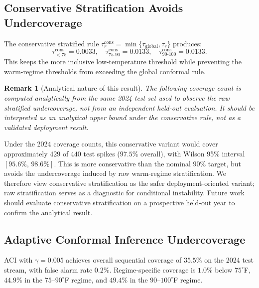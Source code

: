 \documentclass{article}
\newtheorem{remark}{Remark}
\begin{document}
\subsection{Conservative Stratification Avoids Undercoverage}

The conservative stratified rule $\tau_r^{\mathrm{cons}} = \min\{\tau_{\mathrm{global}},
\tau_r\}$ produces:
\[
    \tau_{<75}^{\mathrm{cons}}=0.0033,\quad
    \tau_{75\text{-}90}^{\mathrm{cons}}=0.0133,\quad
    \tau_{90\text{-}100}^{\mathrm{cons}}=0.0133.
\]
This keeps the more inclusive low-temperature threshold while preventing the
warm-regime thresholds from exceeding the global conformal rule.

\begin{remark}[Analytical nature of this result]
The following coverage count is computed analytically from the same 2024 test
set used to observe the raw stratified undercoverage, not from an independent
held-out evaluation. It should be interpreted as an analytical upper bound
under the conservative rule, not as a validated deployment result.
\end{remark}

Under the 2024 coverage counts, this conservative variant would cover
approximately $429$ of $440$ test spikes ($97.5\%$ overall), with Wilson 95\%
interval $[95.6\%,\,98.6\%]$. This is more conservative than the nominal
$90\%$ target, but avoids the undercoverage induced by raw warm-regime
stratification. We therefore view conservative stratification as the safer
deployment-oriented variant; raw stratification serves as a diagnostic for
conditional instability. Future work should evaluate conservative stratification
on a prospective held-out year to confirm the analytical result.

\subsection{Adaptive Conformal Inference Undercoverage}

ACI with $\gamma=0.005$ achieves overall sequential coverage of $35.5\%$ on
the 2024 test stream, with false alarm rate $0.2\%$. Regime-specific coverage
is $1.0\%$ below $75^{\circ}$F, $44.9\%$ in the $75$--$90^{\circ}$F regime,
and $49.4\%$ in the $90$--$100^{\circ}$F regime.
\end{document}
